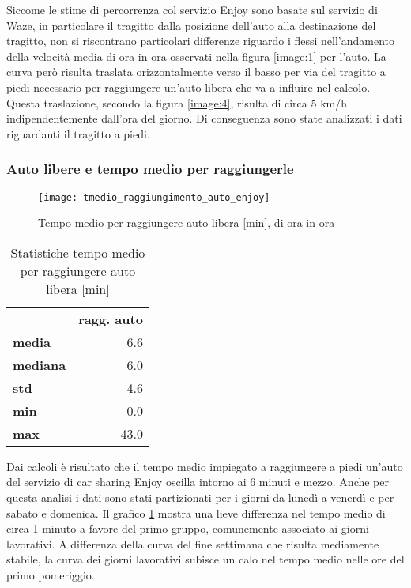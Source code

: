 Siccome le stime di percorrenza col servizio Enjoy sono basate sul servizio di Waze, in particolare il tragitto dalla posizione dell'auto alla destinazione del tragitto, non si riscontrano particolari differenze riguardo i flessi nell'andamento della velocità media di ora in ora osservati nella figura \ref{image:1} per l'auto. La curva però risulta traslata orizzontalmente verso il basso per via del tragitto a piedi necessario per raggiungere un'auto libera che va a influire nel calcolo. Questa traslazione, secondo la figura \ref{image:4}, risulta di circa 5 km/h indipendentemente dall'ora del giorno. Di conseguenza sono state analizzati i dati riguardanti il tragitto a piedi.

\subsubsection{Auto libere e tempo medio per raggiungerle}

\begin{figure}[H]
	\texttt{[image: tmedio\_raggiungimento\_auto\_enjoy]}
	\caption{Tempo medio per raggiungere auto libera [min], di ora in ora}
	\label{image:5}
\end{figure}

\begin{table}[H]
	\centering
	\begin{tabular}{ | l r | }
		\hline
		& \textbf{ragg. auto} \\
		\textbf{media}   &  6.6 \\
		\textbf{mediana} &  6.0 \\
		\textbf{std}     &  4.6 \\
		\textbf{min}     &  0.0 \\ 
		\textbf{max}     & 43.0 \\
		\hline
	\end{tabular}
	\caption{Statistiche tempo medio per raggiungere auto libera [min]}
	\label{table:4}
\end{table}

Dai calcoli è risultato che il tempo medio impiegato a raggiungere a piedi un'auto del servizio di car sharing Enjoy oscilla intorno ai 6 minuti e mezzo. Anche per questa analisi i dati sono stati partizionati per i giorni da lunedì a venerdì e per sabato e domenica. Il grafico \ref{image:5} mostra una lieve differenza nel tempo medio di circa 1 minuto a favore del primo gruppo, comunemente associato ai giorni lavorativi. A differenza della curva del fine settimana che risulta mediamente stabile, la curva dei giorni lavorativi subisce un calo nel tempo medio nelle ore del primo pomeriggio.

